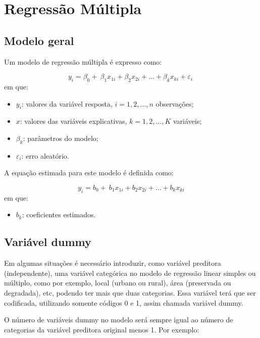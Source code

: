 \documentclass[12pt,brazil,oneside]{book}
\providecommand{\tightlist}{%
  \setlength{\itemsep}{0pt}\setlength{\parskip}{0pt}}
\begin{document}
\hypertarget{regressao-multipla}{%
\chapter{Regressão Múltipla}\label{regressao-multipla}}

\hypertarget{modelo-geral}{%
\section{Modelo geral}\label{modelo-geral}}

Um modelo de regressão múltipla é expresso como:

\[ 
y_{i} = \beta_0+\ \beta_1x_{1i}+\beta_2x_{2i}+\dots+\beta_kx_{ki}+\varepsilon_i\ 
\] \noindent em que:

\begin{itemize}
\item
  \(y_{i}\): valores da variável resposta, \(i = 1, 2,..., n\)
  observações;
\item
  \(x\): valores das variáveis explicativas, \(k = 1, 2,..., K\)
  variáveis;
\item
  \(\beta_k\): parâmetros do modelo;
\item
  \(\varepsilon_i\): erro aleatório.
\end{itemize}

A equação estimada para este modelo é definida como:

\[ 
y_{i} = b_0+\ b_1x_{1i}+b_2x_{2i}+\dots+b_kx_{ki} 
\] em que:

\begin{itemize}
\tightlist
\item
  \(b_k\): coeficientes estimados.
\end{itemize}

\hypertarget{variavel-dummy}{%
\section{Variável dummy}\label{variavel-dummy}}

Em algumas situações é necessário introduzir, como variável preditora
(independente), uma variável categórica no modelo de regressão linear
simples ou múltiplo, como por exemplo, local (urbano ou rural), área
(preservada ou degradada), etc, podendo ter mais que duas categorias.
Essa variável terá que ser codificada, utilizando somente códigos 0 e 1,
assim chamada variável dummy.

O número de variáveis dummy no modelo será sempre igual ao número de
categorias da variável preditora original menos 1. Por exemplo:
\end{document}
